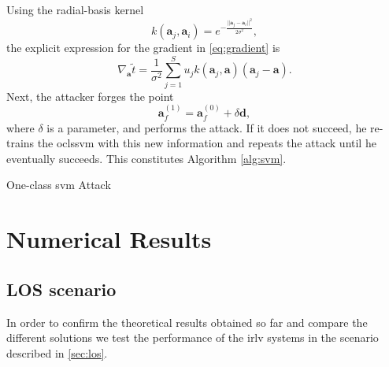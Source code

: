\documentclass[draftcls,onecolumn,12pt]{IEEEtran}
\begin{document}
Using the radial-basis kernel
\begin{equation}
k(\mathbf{a}_j,\mathbf{a}_i) = e^{-\frac{||\mathbf{a}_j-\mathbf{a}_i||^2}{2\sigma^2}},
\end{equation}
the explicit expression for the gradient in \eqref{eq:gradient} is
\begin{equation}
	\nabla_{\mathbf{a}} \tilde{t} =\frac{1}{\sigma^2} \sum_{j=1}^{S} u_j k(\mathbf{a}_j,\mathbf{a}) (\mathbf{a}_j - \mathbf{a}).
\end{equation}
Next, the attacker forges the point
\begin{equation}
	\mathbf{a}_f^{(1)} = \mathbf{a}_f^{(0)} + \delta \mathbf{d}, 	
\end{equation}
where $\delta$ is a parameter, and performs the attack. If it does not succeed, he re-trains the \ac{oclssvm} with this new information and repeats the attack until he eventually succeeds. This constitutes Algorithm \ref{alg:svm}.

\begin{algorithm}[t]
\label{alg:svm}
  \scriptsize

 

    
 \caption{One-class \ac{svm} Attack}
\end{algorithm}


\section{Numerical Results}

\subsection{LOS scenario}\label{sec:res_los}
In order to confirm the theoretical results obtained so far and compare the different solutions we test the performance of the \ac{irlv} systems in the scenario described in \ref{sec:los}.
\end{document}
